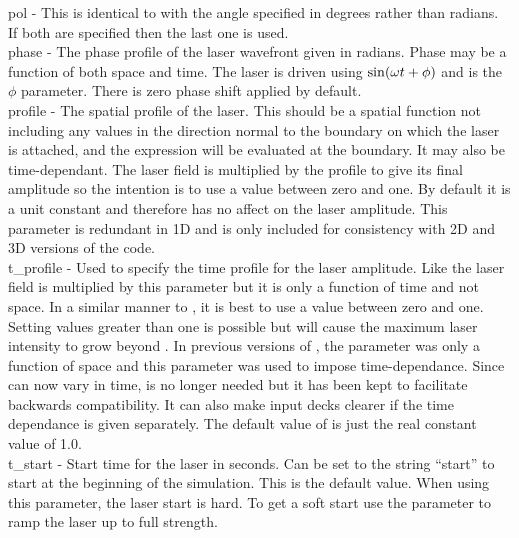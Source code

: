 {\emphtext pol} - This is identical to  with the angle
  specified in degrees rather than radians. If both are specified then the
  last one is used.\\

{\emphtext phase} - The phase profile of the laser wavefront given in radians.
  Phase may be a function of both space and time. The laser is driven using
  ${\rm{sin}}(\omega t + \phi)$ and  is the $\phi$ parameter.
  There is zero phase shift applied by default.\\

{\emphtext profile} - The spatial profile of the laser. This should be a
  spatial function not including any values in the direction normal to the
  boundary on which the laser is attached, and the expression will be
  evaluated at the boundary. It may also be time-dependant.
  The laser field is multiplied by the profile to give
  its final amplitude so the intention is to use a value between zero and one.
  By default it is a unit constant and therefore has no affect on the laser
  amplitude. This parameter is redundant in 1D and is
  only included for consistency with 2D and 3D versions of the code.\\

{\emphtext t\_profile} - Used to specify the time profile for the laser
  amplitude. Like  the laser field is multiplied by
  this parameter but it is only a function of time and not space.
  In a similar manner to , it is best to use a value
  between zero and one.  Setting values greater than one is possible but will
  cause the maximum laser intensity to grow beyond .
  In previous
  versions of {\EPOCH}, the  parameter was only a function
  of space and this parameter was used to impose time-dependance. Since
   can now vary in time,  is no
  longer needed but it has been kept to facilitate backwards compatibility. It
  can also make input decks clearer if the time dependance is given separately.
  The default value of  is just the real constant
  value of 1.0.\\

{\emphtext t\_start} - Start time for the laser in seconds. Can be set to the
  string ``start'' to start at the beginning of the simulation. This is the
  default value. When using this parameter, the laser start is hard. To get a
  soft start use the  parameter to ramp the laser up to
  full strength.\\

